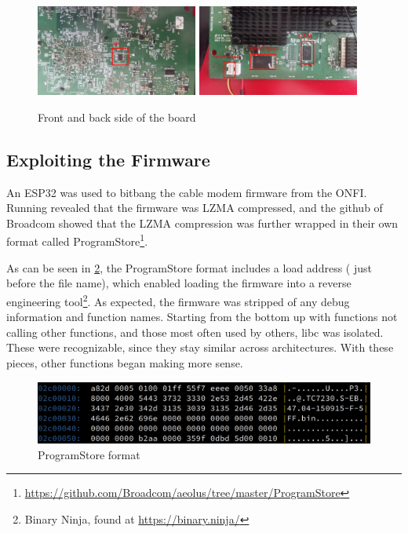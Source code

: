\begin{figure}
  \includegraphics[width=0.475\textwidth]{graphics/spi}
  \hfill
  \includegraphics[width=0.475\textwidth]{graphics/nand}
  \caption{Front and back side of the board}
  \label{fig:physicalModem}
\end{figure}

\subsection{Exploiting the Firmware}
An ESP32 was used to bitbang the cable modem firmware from the ONFI.
Running  revealed that the firmware was LZMA compressed, and the github of Broadcom showed that the LZMA compression was further wrapped in their own format called ProgramStore\footnote{\url{https://github.com/Broadcom/aeolus/tree/master/ProgramStore}}.

As can be seen in \cref{fig:programStore}, the ProgramStore format includes a load address ( just before the file name), which enabled loading the firmware into a reverse engineering tool\footnote{Binary Ninja, found at \url{https://binary.ninja/}}.
As expected, the firmware was stripped of any debug information and function names.
Starting from the bottom up with functions not calling other functions, and those most often used by others, libc was isolated.
These were recognizable, since they stay similar across architectures.
With these pieces, other functions began making more sense.

\begin{figure}
  \centering
  \includegraphics[scale=0.1]{graphics/nooobi}
  \caption{ProgramStore format}
  \label{fig:programStore}
\end{figure}

